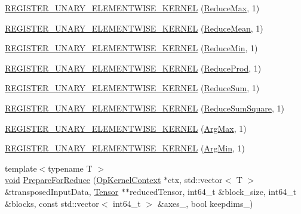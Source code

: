\begin{DoxyCompactItemize}
\item 
\mbox{\hyperlink{namespaceonnxruntime_a9fa6c41523491546a82ed39a984feb86}{R\+E\+G\+I\+S\+T\+E\+R\+\_\+\+U\+N\+A\+R\+Y\+\_\+\+E\+L\+E\+M\+E\+N\+T\+W\+I\+S\+E\+\_\+\+K\+E\+R\+N\+EL}} (\mbox{\hyperlink{classonnxruntime_1_1ReduceMax}{Reduce\+Max}}, 1)
\item 
\mbox{\hyperlink{namespaceonnxruntime_a1839af015e25a33a7d475b8f0e12d572}{R\+E\+G\+I\+S\+T\+E\+R\+\_\+\+U\+N\+A\+R\+Y\+\_\+\+E\+L\+E\+M\+E\+N\+T\+W\+I\+S\+E\+\_\+\+K\+E\+R\+N\+EL}} (\mbox{\hyperlink{classonnxruntime_1_1ReduceMean}{Reduce\+Mean}}, 1)
\item 
\mbox{\hyperlink{namespaceonnxruntime_aecc610a34a66d5ca2e200575d9a9a7c0}{R\+E\+G\+I\+S\+T\+E\+R\+\_\+\+U\+N\+A\+R\+Y\+\_\+\+E\+L\+E\+M\+E\+N\+T\+W\+I\+S\+E\+\_\+\+K\+E\+R\+N\+EL}} (\mbox{\hyperlink{classonnxruntime_1_1ReduceMin}{Reduce\+Min}}, 1)
\item 
\mbox{\hyperlink{namespaceonnxruntime_aec7c7575ed9ad1d9fece86481231505d}{R\+E\+G\+I\+S\+T\+E\+R\+\_\+\+U\+N\+A\+R\+Y\+\_\+\+E\+L\+E\+M\+E\+N\+T\+W\+I\+S\+E\+\_\+\+K\+E\+R\+N\+EL}} (\mbox{\hyperlink{classonnxruntime_1_1ReduceProd}{Reduce\+Prod}}, 1)
\item 
\mbox{\hyperlink{namespaceonnxruntime_a4edce93cb6d321903c598d3de373f4c9}{R\+E\+G\+I\+S\+T\+E\+R\+\_\+\+U\+N\+A\+R\+Y\+\_\+\+E\+L\+E\+M\+E\+N\+T\+W\+I\+S\+E\+\_\+\+K\+E\+R\+N\+EL}} (\mbox{\hyperlink{classonnxruntime_1_1ReduceSum}{Reduce\+Sum}}, 1)
\item 
\mbox{\hyperlink{namespaceonnxruntime_a21ff9bc989ce6029b8aded6581c31164}{R\+E\+G\+I\+S\+T\+E\+R\+\_\+\+U\+N\+A\+R\+Y\+\_\+\+E\+L\+E\+M\+E\+N\+T\+W\+I\+S\+E\+\_\+\+K\+E\+R\+N\+EL}} (\mbox{\hyperlink{classonnxruntime_1_1ReduceSumSquare}{Reduce\+Sum\+Square}}, 1)
\item 
\mbox{\hyperlink{namespaceonnxruntime_ad1b041424917194ed0beaf0aaa19641f}{R\+E\+G\+I\+S\+T\+E\+R\+\_\+\+U\+N\+A\+R\+Y\+\_\+\+E\+L\+E\+M\+E\+N\+T\+W\+I\+S\+E\+\_\+\+K\+E\+R\+N\+EL}} (\mbox{\hyperlink{classonnxruntime_1_1ArgMax}{Arg\+Max}}, 1)
\item 
\mbox{\hyperlink{namespaceonnxruntime_a20c5343db4bf69674f9e23e5cf6fd611}{R\+E\+G\+I\+S\+T\+E\+R\+\_\+\+U\+N\+A\+R\+Y\+\_\+\+E\+L\+E\+M\+E\+N\+T\+W\+I\+S\+E\+\_\+\+K\+E\+R\+N\+EL}} (\mbox{\hyperlink{classonnxruntime_1_1ArgMin}{Arg\+Min}}, 1)
\item 
{\footnotesize template$<$typename T $>$ }\\\mbox{\hyperlink{mlasi_8h_a88f941d423cb2a819b70a1358982b1a6}{void}} \mbox{\hyperlink{namespaceonnxruntime_a13f102913e6ac947fb6df1a6aea1ec25}{Prepare\+For\+Reduce}} (\mbox{\hyperlink{classonnxruntime_1_1OpKernelContext}{Op\+Kernel\+Context}} $\ast$ctx, std\+::vector$<$ T $>$ \&transposed\+Input\+Data, \mbox{\hyperlink{classonnxruntime_1_1Tensor}{Tensor}} $\ast$$\ast$reduced\+Tensor, int64\+\_\+t \&block\+\_\+size, int64\+\_\+t \&blocks, const std\+::vector$<$ int64\+\_\+t $>$ \&axes\+\_\+, bool keepdims\+\_\+)
$$
\end{DoxyCompactItemize}
